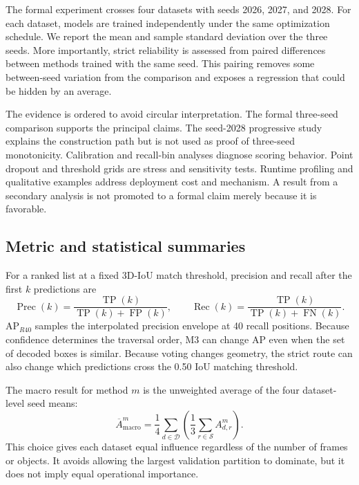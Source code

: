 \documentclass[final,5p,times]{elsarticle}
\begin{document}
The formal experiment crosses four datasets with seeds 2026, 2027, and 2028.
For each dataset, models are trained independently under the same optimization
schedule. We report the mean and sample standard deviation over the three
seeds. More importantly, strict reliability is assessed from paired
differences between methods trained with the same seed. This pairing removes
some between-seed variation from the comparison and exposes a regression that
could be hidden by an average.

The evidence is ordered to avoid circular interpretation. The formal
three-seed comparison supports the principal claims. The seed-2028 progressive
study explains the construction path but is not used as proof of three-seed
monotonicity. Calibration and recall-bin analyses diagnose scoring behavior.
Point dropout and threshold grids are stress and sensitivity tests. Runtime
profiling and qualitative examples address deployment cost and mechanism. A
result from a secondary analysis is not promoted to a formal claim merely
because it is favorable.

\subsection{Metric and statistical summaries}

For a ranked list at a fixed 3D-IoU match threshold, precision and recall after
the first $k$ predictions are
\begin{equation}
\operatorname{Prec}(k)=\frac{\operatorname{TP}(k)}
{\operatorname{TP}(k)+\operatorname{FP}(k)},\qquad
\operatorname{Rec}(k)=\frac{\operatorname{TP}(k)}
{\operatorname{TP}(k)+\operatorname{FN}(k)}.
\end{equation}
AP$_{R40}$ samples the interpolated precision envelope at 40 recall positions.
Because confidence determines the traversal order, M3 can change AP even when
the set of decoded boxes is similar. Because voting changes geometry, the
strict route can also change which predictions cross the 0.50 IoU matching
threshold.

The macro result for method $m$ is the unweighted average of the four
dataset-level seed means:
\begin{equation}
\overline A_{\mathrm{macro}}^m =
\frac{1}{4}\sum_{d\in\mathcal{D}}
\left(\frac{1}{3}\sum_{r\in\mathcal{S}} A_{d,r}^m\right).
\end{equation}
This choice gives each dataset equal influence regardless of the number of
frames or objects. It avoids allowing the largest validation partition to
dominate, but it does not imply equal operational importance.
\end{document}
